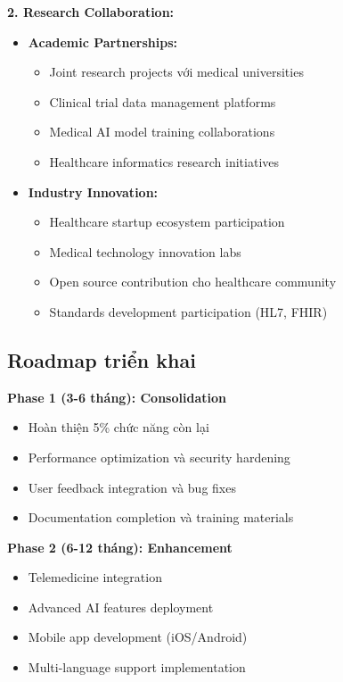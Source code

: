 \documentclass[../DoAn.tex]{subfiles}
\begin{document}
\textbf{2. Research Collaboration:}
\begin{itemize}
    \item \textbf{Academic Partnerships:}
    \begin{itemize}
        \item Joint research projects với medical universities
        \item Clinical trial data management platforms
        \item Medical AI model training collaborations
        \item Healthcare informatics research initiatives
    \end{itemize}
    
    \item \textbf{Industry Innovation:}
    \begin{itemize}
        \item Healthcare startup ecosystem participation
        \item Medical technology innovation labs
        \item Open source contribution cho healthcare community
        \item Standards development participation (HL7, FHIR)
    \end{itemize}
\end{itemize}

\subsection{Roadmap triển khai}

\textbf{Phase 1 (3-6 tháng): Consolidation}
\begin{itemize}
    \item Hoàn thiện 5\% chức năng còn lại
    \item Performance optimization và security hardening
    \item User feedback integration và bug fixes
    \item Documentation completion và training materials
\end{itemize}

\textbf{Phase 2 (6-12 tháng): Enhancement}
\begin{itemize}
    \item Telemedicine integration
    \item Advanced AI features deployment
    \item Mobile app development (iOS/Android)
    \item Multi-language support implementation
\end{itemize}
\end{document}
